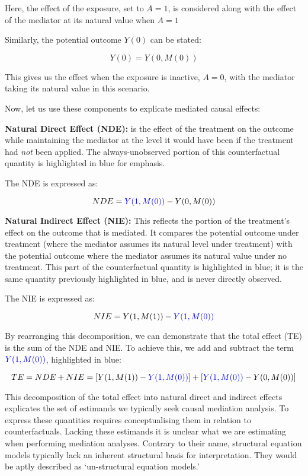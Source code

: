 \documentclass[
  singlecolumn,
  9pt]{article}
\begin{document}
Here, the effect of the exposure, set to \(A = 1\), is considered along
with the effect of the mediator at its natural value when \(A = 1\)

Similarly, the potential outcome \(Y(0)\) can be stated:

\[ 
Y(0) = Y(0, M(0))
\]

This gives us the effect when the exposure is inactive, \(A = 0\), with
the mediator taking its natural value in this scenario.

Now, let us use these components to explicate mediated causal effects:

\textbf{Natural Direct Effect (NDE):} is the effect of the treatment on
the outcome while maintaining the mediator at the level it would have
been if the treatment had \emph{not} been applied. The always-unobserved
portion of this counterfactual quantity is highlighted in blue for
emphasis.

The NDE is expressed as:

\[
 NDE = \textcolor{blue}{Y(1, M(0))} - Y(0, M(0))
 \]

\textbf{Natural Indirect Effect (NIE):} This reflects the portion of the
treatment's effect on the outcome that is mediated. It compares the
potential outcome under treatment (where the mediator assumes its
natural level under treatment) with the potential outcome where the
mediator assumes its natural value under no treatment. This part of the
counterfactual quantity is highlighted in blue; it is the same quantity
previously highlighted in blue, and is never directly observed.

The NIE is expressed as:

\[
 NIE = Y(1, M(1)) - \textcolor{blue}{Y(1, M(0))}
\]

By rearranging this decomposition, we can demonstrate that the total
effect (TE) is the sum of the NDE and NIE. To achieve this, we add and
subtract the term \(\textcolor{blue}{Y(1, M(0))}\), highlighted in blue:

\[
TE = NDE + NIE = [Y(1, M(1)) - \textcolor{blue}{Y(1, M(0))}] + [\textcolor{blue}{Y(1, M(0))} - Y(0, M(0))]
\]

This decomposition of the total effect into natural direct and indirect
effects explicates the set of estimands we typically seek causal
mediation analysis. To express these quantities requires conceptualising
them in relation to counterfactuals. Lacking these estimands it is
unclear what we are estimating when performing mediation analyses.
Contrary to their name, structural equation models typically lack an
inherent structural basis for interpretation. They would be aptly
described as `un-structural equation models.'
\end{document}
